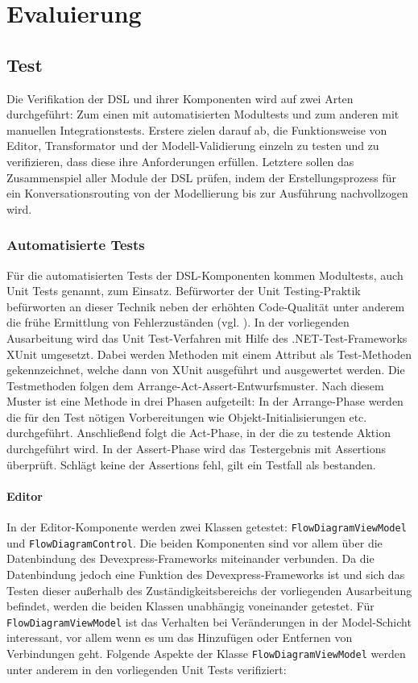\chapter{Evaluierung}

\section{Test}
Die Verifikation der DSL und ihrer Komponenten wird auf zwei Arten durchgeführt: Zum einen mit automatisierten Modultests und zum anderen mit manuellen Integrationstests. Erstere zielen darauf ab, die Funktionsweise von Editor, Transformator und der Modell-Validierung einzeln zu testen und zu verifizieren, dass diese ihre Anforderungen erfüllen. Letztere sollen das Zusammenspiel aller Module der DSL prüfen, indem der Erstellungsprozess für ein Konversationsrouting von der Modellierung bis zur Ausführung nachvollzogen wird.

\subsection{Automatisierte Tests}
Für die automatisierten Tests der DSL-Komponenten kommen Modultests, auch Unit Tests genannt, zum Einsatz. Befürworter der Unit Testing-Praktik befürworten an dieser Technik neben der erhöhten Code-Qualität unter anderem die frühe Ermittlung von Fehlerzuständen (vgl. \cite{Novoseltseva:17}). In der vorliegenden Ausarbeitung wird das Unit Test-Verfahren mit Hilfe des .NET-Test-Frameworks XUnit umgesetzt. Dabei werden Methoden mit einem Attribut als Test-Methoden gekennzeichnet, welche dann von XUnit ausgeführt und ausgewertet werden. Die Testmethoden folgen dem Arrange-Act-Assert-Entwurfsmuster. Nach diesem Muster ist eine Methode in drei Phasen aufgeteilt: In der Arrange-Phase werden die für den Test nötigen Vorbereitungen wie Objekt-Initialisierungen etc. durchgeführt. Anschließend folgt die Act-Phase, in der die zu testende Aktion durchgeführt wird. In der Assert-Phase wird das Testergebnis mit Assertions überprüft. Schlägt keine der Assertions fehl, gilt ein Testfall als bestanden.

\subsubsection{Editor}
In der Editor-Komponente werden zwei Klassen getestet: \texttt{FlowDiagramViewModel} und \texttt{FlowDiagramControl}. Die beiden Komponenten sind vor allem über die Datenbindung des Devexpress-Frameworks miteinander verbunden. Da die Datenbindung jedoch eine Funktion des Devexpress-Frameworks ist und sich das Testen dieser außerhalb des Zuständigkeitsbereichs der vorliegenden Ausarbeitung befindet, werden die beiden Klassen unabhängig voneinander getestet. Für \texttt{FlowDiagramViewModel} ist das Verhalten bei Veränderungen in der Model-Schicht interessant, vor allem wenn es um das Hinzufügen oder Entfernen von Verbindungen geht. Folgende Aspekte der Klasse \texttt{FlowDiagramViewModel} werden unter anderem in den vorliegenden Unit Tests verifiziert: 


